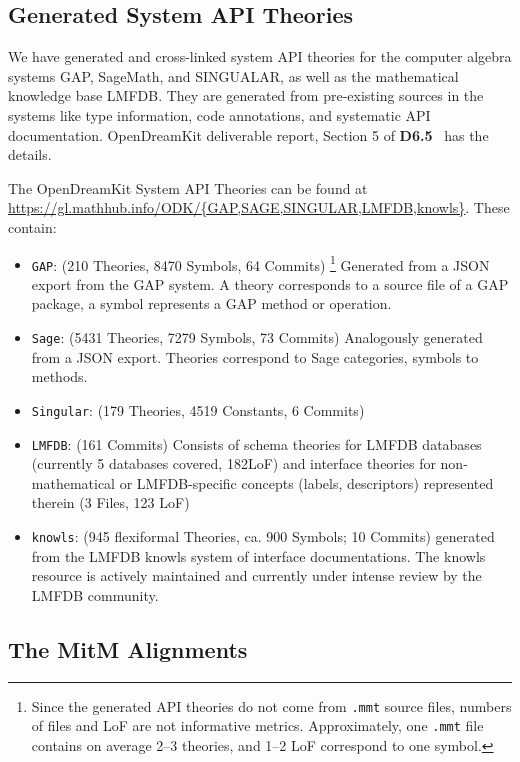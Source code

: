 \subsection{Generated System API Theories}\label{sec:sysapis:gentheories}

We have generated and cross-linked system API theories for the computer algebra systems
GAP, SageMath, and SINGUALAR, as well as the mathematical knowledge base LMFDB. They are
generated from pre-existing sources in the systems like type information, code
annotations, and systematic API documentation.  OpenDreamKit deliverable report, Section
5 of \textbf{D6.5}~\cite{ODK-D6.5} has the details.  


The OpenDreamKit System API Theories can be found at
\url{https://gl.mathhub.info/ODK/{GAP,SAGE,SINGULAR,LMFDB,knowls}}. These contain:
\begin{itemize}
\item \texttt{GAP}: (210 Theories, 8470 Symbols, 64 Commits) \footnote{Since the generated
    API theories do not come from \texttt{.mmt} source files, numbers of files and LoF are
    not informative metrics. Approximately, one \texttt{.mmt} file contains on average
    2--3 theories, and 1--2 LoF correspond to one symbol.}  Generated from a JSON export
  from the GAP system. A theory corresponds to a source file of a GAP package, a symbol
  represents a GAP method or operation.
\item \texttt{Sage}: (5431 Theories, 7279 Symbols, 73 Commits) Analogously generated from
  a JSON export. Theories correspond to Sage categories, symbols to methods.
\item \texttt{Singular}: (179 Theories, 4519 Constants, 6 Commits) 
\item \texttt{LMFDB}: (161 Commits) Consists of schema theories for LMFDB databases
  (currently 5 databases covered, 182LoF) and interface theories for non-mathematical or
  LMFDB-specific concepts (labels, descriptors) represented therein (3 Files, 123 LoF)
\item \texttt{knowls}: (945 flexiformal Theories, ca. 900 Symbols; 10 Commits) generated
  from the LMFDB knowls system of interface documentations. The knowls resource is
  actively maintained and currently under intense review by the LMFDB community. 
\end{itemize}

\subsection{The MitM Alignments}

